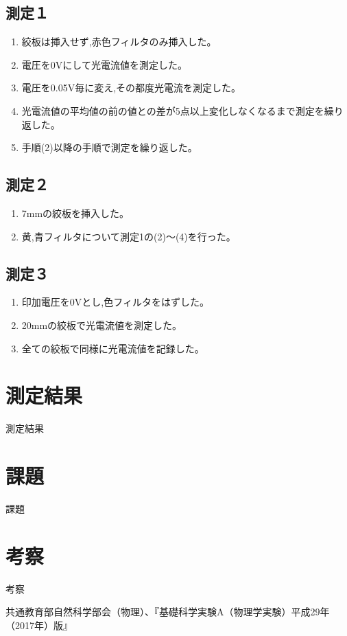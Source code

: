 \documentclass{jsarticle}
\begin{document}
\subsection{測定１}
\begin{enumerate}
\item 絞板は挿入せず,赤色フィルタのみ挿入した。
\item 電圧を0Vにして光電流値を測定した。
\item 電圧を0.05V毎に変え,その都度光電流を測定した。
\item 光電流値の平均値の前の値との差が5点以上変化しなくなるまで測定を繰り返した。
\item 手順(2)以降の手順で測定を繰り返した。
\end{enumerate}
\subsection{測定２}
\begin{enumerate}
\item 7mmの絞板を挿入した。
\item 黄,青フィルタについて測定1の(2)～(4)を行った。
\end{enumerate}
\subsection{測定３}
\begin{enumerate}
\item 印加電圧を0Vとし,色フィルタをはずした。
\item 20mmの絞板で光電流値を測定した。
\item 全ての絞板で同様に光電流値を記録した。
\end{enumerate}


\section{測定結果}

測定結果

\section{課題}

課題

\section{考察}

考察






\begin{thebibliography}{99}
     共通教育部自然科学部会（物理）、『基礎科学実験A（物理学実験）平成29年（2017年）版』
\end{thebibliography}
\end{document}
